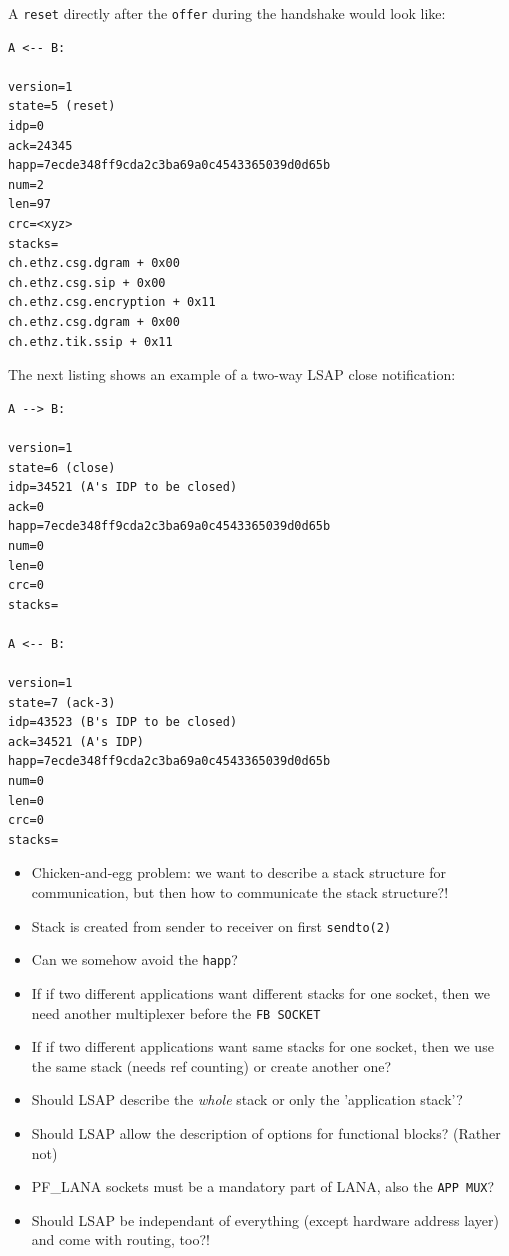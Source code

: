 \documentclass[times,10pt,twocolumn]{article}
\begin{document}
A \texttt{reset} directly after the \texttt{offer} during the handshake would
look like:
\scriptsize{
\begin{lstlisting}
A <-- B:

version=1
state=5 (reset)
idp=0
ack=24345
happ=7ecde348ff9cda2c3ba69a0c4543365039d0d65b
num=2
len=97
crc=<xyz>
stacks=
ch.ethz.csg.dgram + 0x00
ch.ethz.csg.sip + 0x00
ch.ethz.csg.encryption + 0x11
ch.ethz.csg.dgram + 0x00
ch.ethz.tik.ssip + 0x11
\end{lstlisting}
}
\normalsize

The next listing shows an example of a two-way LSAP close notification:
\scriptsize{
\begin{lstlisting}
A --> B:

version=1
state=6 (close)
idp=34521 (A's IDP to be closed)
ack=0
happ=7ecde348ff9cda2c3ba69a0c4543365039d0d65b
num=0
len=0
crc=0
stacks=

A <-- B:

version=1
state=7 (ack-3)
idp=43523 (B's IDP to be closed)
ack=34521 (A's IDP)
happ=7ecde348ff9cda2c3ba69a0c4543365039d0d65b
num=0
len=0
crc=0
stacks=
\end{lstlisting}
}
\normalsize

\label{iss}
\begin{itemize}
        \setlength{\itemsep}{-1mm}
	\item Chicken-and-egg problem: we want to describe a stack structure for
              communication, but then how to communicate the stack structure?!
	\item Stack is created from sender to receiver on first \texttt{sendto(2)}
	\item Can we somehow avoid the \texttt{happ}?
	\item If if two different applications want different stacks for one
	      socket, then we need another multiplexer before the \texttt{FB SOCKET}
	\item If if two different applications want same stacks for one
	      socket, then we use the same stack (needs ref counting) or create
	      another one?
	\item Should LSAP describe the \textit{whole} stack or only the 'application stack'?
	\item Should LSAP allow the description of options for functional blocks? (Rather not)
	\item PF\_LANA sockets must be a mandatory part of LANA, also the \texttt{APP MUX}?
	\item Should LSAP be independant of everything (except hardware address
	      layer) and come with routing, too?!
\end{itemize}
\end{document}
